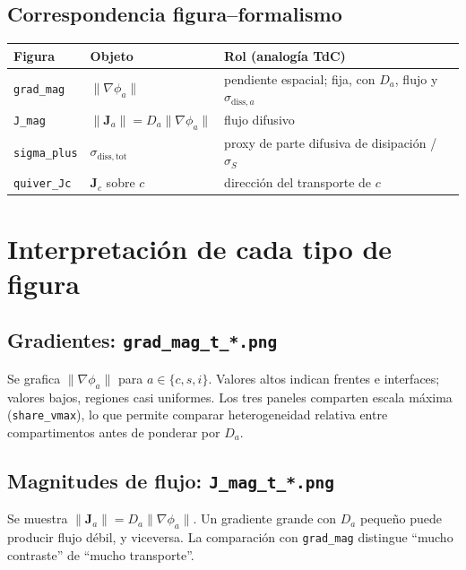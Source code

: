 \documentclass[11pt,a4paper]{article}
\newcommand{\vect}[1]{\mathbf{#1}}
\begin{document}
\subsection{Correspondencia figura--formalismo}

\begin{center}
\begin{tabular}{@{}p{3.2cm}p{4.5cm}p{5.5cm}@{}}
\toprule
Figura & Objeto & Rol (analogía TdC) \\
\midrule
\texttt{grad\_mag} &
$\lVert\nabla\phi_a\rVert$ &
pendiente espacial; fija, con $D_a$, flujo y $\sigma_{\mathrm{diss},a}$ \\
\texttt{J\_mag} &
$\lVert\vect{J}_a\rVert = D_a\lVert\nabla\phi_a\rVert$ &
flujo difusivo \\
\texttt{sigma\_plus} &
$\sigma_{\mathrm{diss,tot}}$ &
proxy de parte difusiva de disipación / $\sigma_S$ \\
\texttt{quiver\_Jc} &
$\vect{J}_c$ sobre $c$ &
dirección del transporte de $c$ \\
\bottomrule
\end{tabular}
\end{center}

\section{Interpretación de cada tipo de figura}

\subsection{Gradientes: \texttt{grad\_mag\_t\_*.png}}

Se grafica $\lVert\nabla\phi_a\rVert$ para $a\in\{c,s,i\}$. Valores altos
indican frentes e interfaces; valores bajos, regiones casi uniformes. Los tres
paneles comparten escala máxima (\texttt{share\_vmax}), lo que permite comparar
heterogeneidad relativa entre compartimentos antes de ponderar por $D_a$.

\subsection{Magnitudes de flujo: \texttt{J\_mag\_t\_*.png}}

Se muestra $\lVert\vect{J}_a\rVert = D_a\lVert\nabla\phi_a\rVert$. Un gradiente
grande con $D_a$ pequeño puede producir flujo débil, y viceversa. La comparación
con \texttt{grad\_mag} distingue ``mucho contraste'' de ``mucho transporte''.
\end{document}
